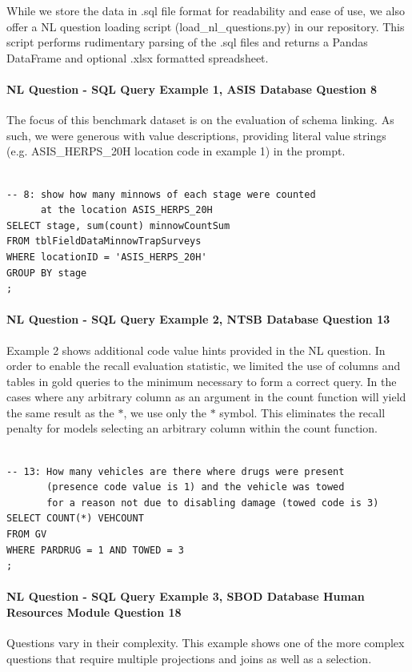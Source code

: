 While we store the data in .sql file format for readability and ease of use, we also offer a NL question loading script (load\_nl\_questions.py) in our repository. 
This script performs rudimentary parsing of the .sql files and returns a Pandas DataFrame and optional .xlsx formatted spreadsheet.

\paragraph{NL Question - SQL Query Example 1, ASIS Database Question 8}
The focus of this benchmark dataset is on the evaluation of schema linking.
As such, we were generous with value descriptions, providing literal value strings (e.g. ASIS\_HERPS\_20H location code in example 1) in the prompt.

\begin{verbatim}

-- 8: show how many minnows of each stage were counted 
      at the location ASIS_HERPS_20H
SELECT stage, sum(count) minnowCountSum
FROM tblFieldDataMinnowTrapSurveys
WHERE locationID = 'ASIS_HERPS_20H'
GROUP BY stage
;
\end{verbatim}

\paragraph{NL Question - SQL Query Example 2, NTSB Database Question 13}
Example 2 shows additional code value hints provided in the NL question.
In order to enable the recall evaluation statistic, we limited the use of columns and tables in gold queries to the minimum necessary to form a correct query.
In the cases where any arbitrary column as an argument in the count function will yield the same result as the $\ast$, we use only the $\ast$ symbol. 
This eliminates the recall penalty for models selecting an arbitrary column within the count function.

\begin{verbatim}

-- 13: How many vehicles are there where drugs were present 
       (presence code value is 1) and the vehicle was towed 
       for a reason not due to disabling damage (towed code is 3)
SELECT COUNT(*) VEHCOUNT
FROM GV
WHERE PARDRUG = 1 AND TOWED = 3
;
\end{verbatim}


\paragraph{NL Question - SQL Query Example 3, SBOD Database Human Resources Module Question 18}
Questions vary in their complexity.
This example shows one of the more complex questions that require multiple projections and joins as well as a selection.

